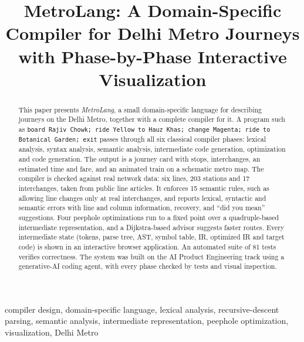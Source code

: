 \documentclass[conference]{IEEEtran}
\begin{document}
\title{MetroLang: A Domain-Specific Compiler for Delhi Metro Journeys with Phase-by-Phase Interactive Visualization}

\author{
}

\maketitle

\begin{abstract}
This paper presents \emph{MetroLang}, a small domain-specific language for describing journeys on the Delhi Metro, together with a complete compiler for it. A program such as \texttt{board Rajiv Chowk; ride Yellow to Hauz Khas; change Magenta; ride to Botanical Garden; exit} passes through all six classical compiler phases: lexical analysis, syntax analysis, semantic analysis, intermediate code generation, optimization and code generation. The output is a journey card with stops, interchanges, an estimated time and fare, and an animated train on a schematic metro map. The compiler is checked against real network data: six lines, 203 stations and 17 interchanges, taken from public line articles. It enforces 15 semantic rules, such as allowing line changes only at real interchanges, and reports lexical, syntactic and semantic errors with line and column information, recovery, and ``did you mean'' suggestions. Four peephole optimizations run to a fixed point over a quadruple-based intermediate representation, and a Dijkstra-based advisor suggests faster routes. Every intermediate state (tokens, parse tree, AST, symbol table, IR, optimized IR and target code) is shown in an interactive browser application. An automated suite of 81 tests verifies correctness. The system was built on the AI Product Engineering track using a generative-AI coding agent, with every phase checked by tests and visual inspection.
\end{abstract}

\begin{IEEEkeywords}
compiler design, domain-specific language, lexical analysis, recursive-descent parsing, semantic analysis, intermediate representation, peephole optimization, visualization, Delhi Metro
\end{IEEEkeywords}
\end{document}
